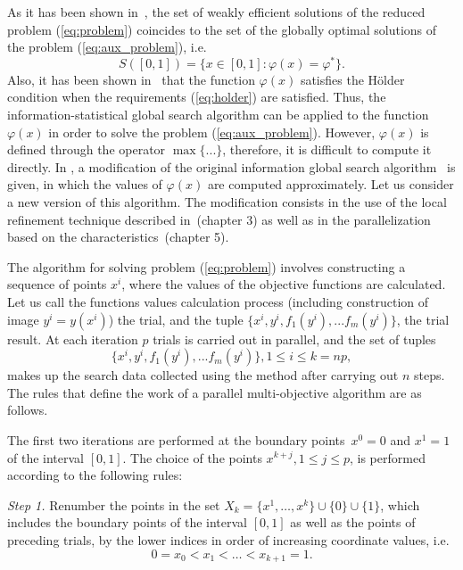 \documentclass{llncs}
\begin{document}
As it has been shown in~\cite{markinStrongin1993}, the set of weakly efficient solutions of the
reduced problem (\ref{eq:problem}) coincides to the set of the globally optimal solutions of
the problem (\ref{eq:aux_problem}), i.e.
\begin{equation}
  \label{eq:s}
  S([0,1])=\{x\in [0,1]:\varphi(x)=\varphi^*\}.
\end{equation}
Also, it has been shown in~\cite{markinStrongin1993} that the function \(\varphi(x)\) satisfies
the H\"older condition when the requirements (\ref{eq:holder}) are satisfied. Thus, the
information-statistical global search algorithm can be applied to the function \(\varphi(x)\) in
order to solve the problem (\ref{eq:aux_problem}). However, \(\varphi(x)\) is defined through
the operator \(\max\{...\}\), therefore, it is difficult to compute it directly. In
\cite{markinStrongin1993}, a modification of the original information
global search algorithm~\cite{mixedAlg} is given, in which the values of \(\varphi(x)\) are computed
approximately. Let us consider a new version of this algorithm. The modification
consists in the use of the local refinement technique described in~\cite{strOptBook}(chapter 3)
as well as in the parallelization based on the characteristics~\cite{strOptBook}(chapter 5).

The algorithm for solving problem (\ref{eq:problem}) involves constructing a sequence of points $x^i$, where the values of the objective functions are calculated. Let us call the functions values calculation process (including construction of image $y^i=y(x^i)$) the trial, and the tuple $\{x^i, y^i , f_1(y^i), ... f_m(y^i)\}$, the trial result. At each iteration $p$ trials is carried out in parallel, and the set of tuples
\[
\{x^i, y^i , f_1(y^i), ... f_m(y^i)\}, 1 \leq i \leq k=np,
\]
makes up the search data collected using the method after carrying out $n$ steps. The rules that define the work of a parallel multi-objective algorithm are as follows.

The first two iterations are performed at the boundary points~\(x^0=0\) and \(x^1=1\) of the
interval \([0,1]\). The choice of the points \(x^{k+j}, 1\leqslant j\leqslant p\), is performed
according to the following rules:

\textit{Step 1.} Renumber the points in the set \(X_k=\{x^1,\dotsc,x^k\}\cup\{0\}\cup\{1\}\),
which includes the boundary points of the interval \([0,1]\) as well as the points of preceding
trials, by the lower indices in order of increasing coordinate values, i.e.
\begin{displaymath}
  0=x_0<x_1<\dotsc<x_{k+1}=1.
\end{displaymath}
\end{document}
